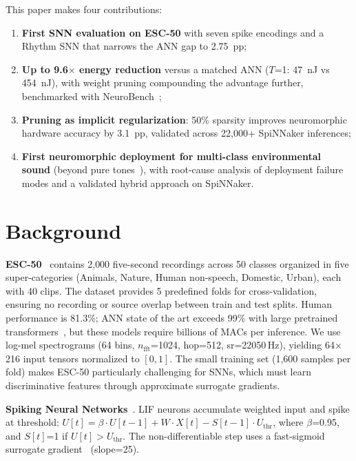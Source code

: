 \documentclass[sigconf,nonacm=false]{acmart}
\begin{document}
This paper makes four contributions:
\begin{enumerate}
    \item \textbf{First SNN evaluation on ESC-50} with seven spike encodings and a Rhythm SNN that narrows the ANN gap to 2.75~pp;
    \item \textbf{Up to 9.6$\times$ energy reduction} versus a matched ANN ($T$=1: 47~nJ vs 454~nJ), with weight pruning compounding the advantage further, benchmarked with NeuroBench~\cite{yik2025};
    \item \textbf{Pruning as implicit regularization}: 50\% sparsity improves neuromorphic hardware accuracy by 3.1~pp, validated across 22{,}000+ SpiNNaker inferences;
    \item \textbf{First neuromorphic deployment for multi-class environmental sound} (beyond pure tones~\cite{dominguez2016}), with root-cause analysis of deployment failure modes and a validated hybrid approach on SpiNNaker.
\end{enumerate}

\section{Background}
\label{sec:background}

\textbf{ESC-50}~\cite{piczak2015} contains 2{,}000 five-second recordings across 50 classes organized in five super-categories (Animals, Nature, Human non-speech, Domestic, Urban), each with 40 clips.
The dataset provides 5 predefined folds for cross-validation, ensuring no recording or source overlap between train and test splits.
Human performance is 81.3\%; ANN state of the art exceeds 99\% with large pretrained transformers~\cite{omnivec2}, but these models require billions of MACs per inference.
We use log-mel spectrograms (64 bins, $n_\text{fft}$=1024, hop=512, sr=22050\,Hz), yielding 64$\times$216 input tensors normalized to $[0,1]$.
The small training set (1{,}600 samples per fold) makes ESC-50 particularly challenging for SNNs, which must learn discriminative features through approximate surrogate gradients.

\textbf{Spiking Neural Networks}~\cite{maass1997}.
LIF neurons accumulate weighted input and spike at threshold:
$U[t] = \beta \cdot U[t{-}1] + W \cdot X[t] - S[t{-}1] \cdot U_\text{thr}$,
where $\beta$=0.95, and $S[t]$=1 if $U[t] > U_\text{thr}$.
The non-differentiable step uses a fast-sigmoid surrogate gradient~\cite{neftci2019,zenke2021} (slope=25).
\end{document}
